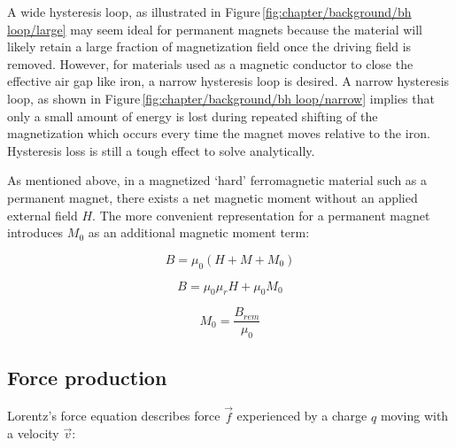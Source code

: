         
        A wide hysteresis loop, as illustrated in Figure\,\ref{fig:chapter/background/bh loop/large} may seem ideal for permanent magnets because the material will likely retain a large fraction of magnetization field once the driving field is removed. However, for materials used as a magnetic conductor to close the effective air gap like iron, a narrow hysteresis loop is desired. A narrow hysteresis loop, as shown in Figure\,\ref{fig:chapter/background/bh loop/narrow} implies that only a small amount of energy is lost during repeated shifting of the magnetization which occurs every time the magnet moves relative to the iron. Hysteresis loss is still a tough effect to solve analytically.
        
        
        As mentioned above, in a magnetized ‘hard’ ferromagnetic material such as a permanent magnet, there exists a net magnetic moment without an applied external field $H$. The more convenient representation for a permanent magnet introduces $M_0$ as an additional magnetic moment term:


        \begin{equation}
            B = \mu_0 (H + M + M_0)
            \label{eq:B field equation 1}
        \end{equation}   
        
        \begin{equation}
            B = \mu_0 \mu_r H + \mu_0 M_0
            \label{eq:B field equation 2}
        \end{equation}   
        
        \begin{equation}
            M_0 = \frac{B_{rem}}{\mu_0}
            \label{eq:B rem equation}
        \end{equation}  
        
    
    \subsection{Force production}                   \label{Chapter:background/electromagnetic field theory/force production}
    
        Lorentz's force equation describes force $\overrightarrow{f}$ experienced by a charge $q$ moving with a velocity $\overrightarrow{v}$:
        
